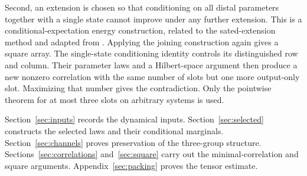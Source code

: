 Second, an extension is chosen so that conditioning on all distal
parameters together with a single state cannot improve under any
further extension. This is a conditional-expectation energy
construction, related to the sated-extension method
\cite{Austin2015} and adapted from
\cite[Section~6]{FourfoldCompanion}. Applying the joining construction
again gives a square array. The single-state conditioning identity
controls its distinguished row and column. Their parameter laws and
a Hilbert-space argument then produce a new nonzero correlation with
the same number of slots but one more output-only slot. Maximizing
that number gives the contradiction. Only the pointwise theorem for
at most three slots on arbitrary systems is used.

Section~\ref{sec:inputs} records the dynamical inputs.
Section~\ref{sec:selected} constructs the selected laws and their
conditional marginals. Section~\ref{sec:channels} proves preservation
of the three-group structure. Sections~\ref{sec:correlations}
and~\ref{sec:square} carry out the minimal-correlation and square
arguments. Appendix~\ref{sec:packing} proves the tensor estimate.
